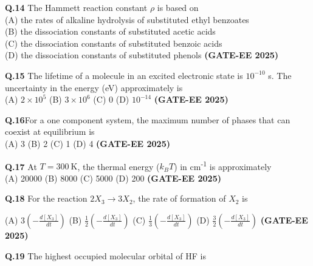 \documentclass[12pt]{article}
\begin{document}
\begin{enumerate}
    \vspace{0.5cm}

    \textbf{Q.14} The Hammett reaction constant $\rho$ is based on\\
    (A) the rates of alkaline hydrolysis of substituted ethyl benzoates\\
    (B) the dissociation constants of substituted acetic acids\\
    (C) the dissociation constants of substituted benzoic acids\\
    (D) the dissociation constants of substituted phenols   \textbf{(GATE-EE 2025)}


    \vspace{0.5cm}

    \textbf{Q.15} The lifetime of a molecule in an excited electronic state is $10^{-10}$ s. The uncertainty in the energy (eV) approximately is\\
    (A) $2 \times 10^5$ \quad (B) $3 \times 10^6$ \quad (C) 0 \quad (D) $10^{-14}$   \textbf{(GATE-EE 2025)}


    \vspace{0.5cm}

    \textbf{Q.16}For a one component system, the maximum number of phases that can coexist at equilibrium is\\
    (A) 3 \quad (B) 2 \quad (C) 1 \quad (D) 4   \textbf{(GATE-EE 2025)}


    \vspace{0.5cm}

    \textbf{Q.17} At $T = 300 \ \mathrm{K}$, the thermal energy ($k_B T$) in cm\textsuperscript{-1} is approximately\\
    (A) 20000 \quad (B) 8000 \quad (C) 5000 \quad (D) 200   \textbf{(GATE-EE 2025)}


    \vspace{0.5cm}

    \textbf{Q.18} For the reaction $2 X_3 \rightarrow 3 X_2$, the rate of formation of $X_2$ is

(A) $3 \left(-\frac{d[X_3]}{dt}\right)$ \hspace{1cm}
(B) $\frac{1}{2} \left(-\frac{d[X_3]}{dt}\right)$ \hspace{1cm}
(C) $\frac{1}{3} \left(-\frac{d[X_3]}{dt}\right)$ \hspace{1cm}
(D) $\frac{3}{2} \left(-\frac{d[X_3]}{dt}\right)$   \textbf{(GATE-EE 2025)}


\vspace{0.5cm}

\textbf{Q.19} The highest occupied molecular orbital of HF is


\end{enumerate}
\end{document}
